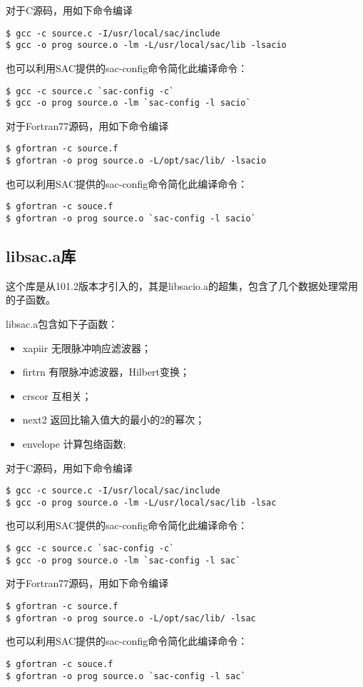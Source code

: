 对于C源码，用如下命令编译
\begin{verbatim}
$ gcc -c source.c -I/usr/local/sac/include
$ gcc -o prog source.o -lm -L/usr/local/sac/lib -lsacio
\end{verbatim}
也可以利用SAC提供的sac-config命令简化此编译命令：
\begin{verbatim}
$ gcc -c source.c `sac-config -c`
$ gcc -o prog source.o -lm `sac-config -l sacio`
\end{verbatim}

对于Fortran77源码，用如下命令编译
\begin{verbatim}
$ gfortran -c source.f
$ gfortran -o prog source.o -L/opt/sac/lib/ -lsacio
\end{verbatim}
也可以利用SAC提供的sac-config命令简化此编译命令：
\begin{verbatim}
$ gfortran -c souce.f
$ gfortran -o prog source.o `sac-config -l sacio`
\end{verbatim}

\subsection{libsac.a库}
这个库是从101.2版本才引入的，其是libsacio.a的超集，包含了几个数据处理常用的子函数。

libsac.a包含如下子函数：
\begin{itemize}
\item xapiir  无限脉冲响应滤波器；
\item firtrn  有限脉冲滤波器，Hilbert变换；
\item crscor  互相关；
\item next2   返回比输入值大的最小的2的幂次；
\item envelope 计算包络函数; 
\end{itemize}

对于C源码，用如下命令编译
\begin{verbatim}
$ gcc -c source.c -I/usr/local/sac/include
$ gcc -o prog source.o -lm -L/usr/local/sac/lib -lsac
\end{verbatim}
也可以利用SAC提供的sac-config命令简化此编译命令：
\begin{verbatim}
$ gcc -c source.c `sac-config -c`
$ gcc -o prog source.o -lm `sac-config -l sac`
\end{verbatim}

对于Fortran77源码，用如下命令编译
\begin{verbatim}
$ gfortran -c source.f
$ gfortran -o prog source.o -L/opt/sac/lib/ -lsac
\end{verbatim}
也可以利用SAC提供的sac-config命令简化此编译命令：
\begin{verbatim}
$ gfortran -c souce.f
$ gfortran -o prog source.o `sac-config -l sac`
\end{verbatim}
